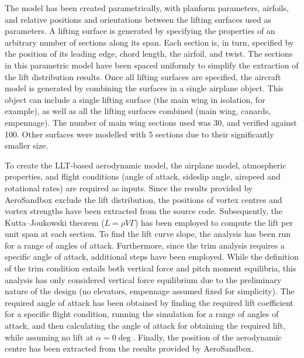 The model has been created parametrically, with planform parameters, airfoils, and relative positions and orientations between the lifting surfaces used as parameters. A lifting surface is generated by specifying the properties of an arbitrary number of sections along its span. Each section is, in turn, specified by the position of its leading edge, chord length, the airfoil, and twist. The sections in this parametric model have been spaced uniformly to simplify the extraction of the lift distribution results. Once all lifting surfaces are specified, the aircraft model is generated by combining the surfaces in a single airplane object. This object can include a single lifting surface (the main wing in isolation, for example), as well as all the lifting surfaces combined (main wing, canards, empennage). The number of main wing sections used was 30, and verified against 100. Other surfaces were modelled with 5 sections due to their significantly smaller size.

To create the LLT-based aerodynamic model, the airplane model, atmospheric properties, and flight conditions (angle of attack, sideslip angle, airspeed and rotational rates) are required as inputs. Since the results provided by AeroSandbox exclude the lift distribution, the positions of vortex centres and vortex strengths have been extracted from the source code. Subsequently, the Kutta–Joukowski theorem ($L=\rho V\Gamma$) has been employed to compute the lift per unit span at each section. To find the lift curve slope, the analysis has been run for a range of angles of attack. Furthermore, since the trim analysis requires a specific angle of attack, additional steps have been employed. While the definition of the trim condition entails both vertical force and pitch moment equilibria, this analysis has only considered vertical force equilibrium due to the preliminary nature of the design (no elevators, empennage assumed fixed for simplicity). The required angle of attack has been obtained by finding the required lift coefficient for a specific flight condition, running the simulation for a range of angles of attack, and then calculating the angle of attack for obtaining the required lift, while assuming no lift at $\alpha=0\deg$. Finally, the position of the aerodynamic centre has been extracted from the results provided by AeroSandbox.

